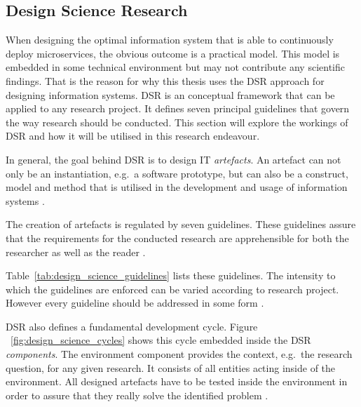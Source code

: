 
\subsection{Design Science Research}%
\label{sec:Design_Science_Research}

When designing the optimal information system that is able to continuously
deploy microservices, the obvious outcome is a practical model. This model is
embedded in some technical environment but may not contribute any scientific
findings. That is the reason for why this thesis uses the \ac{DSR} approach for
designing information systems. \ac{DSR} is an conceptual framework that can be
applied to any research project. It defines seven principal guidelines that
govern the way research should be conducted. This section will explore the
workings of \ac{DSR} and how it will be utilised in this research endeavour.

In general, the goal behind \ac{DSR} is to design \ac{IT} \textit{artefacts}.
An artefact can not only be an instantiation, e.g.\ a software prototype, but
can also be a construct, model and method that is utilised in the development
and usage of information systems \autocite[p.
82]{VonAlanDesignscienceinformation2004}.

The creation of artefacts is regulated by seven guidelines. These guidelines
assure that the requirements for the conducted research are apprehensible for
both the researcher as well as the reader \autocite[p.
82]{VonAlanDesignscienceinformation2004}.


Table~\ref{tab:design_science_guidelines} lists these guidelines. The intensity
to which the guidelines are enforced can be varied according to research
project.  However every guideline should be addressed in some form \autocite[p.
82]{VonAlanDesignscienceinformation2004}. 

\ac{DSR} also defines a fundamental development cycle. Figure
~\ref{fig:design_science_cycles} shows this cycle embedded inside the \ac{DSR}
\textit{components}. The environment component provides the context, e.g.\ the
research question, for any given research. It consists of all entities acting
inside of the environment. All designed artefacts have to be tested inside the
environment in order to assure that they really solve the identified problem
\autocite[p. 89]{HevnerThreeCycleView2007}.

